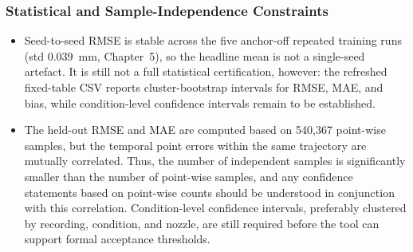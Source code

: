 \subsubsection*{Statistical and Sample-Independence Constraints}
\begin{itemize}
	\item Seed-to-seed RMSE is stable across the five anchor-off repeated training runs (std \SI{0.039}{mm}, Chapter~5), so the headline mean is not a single-seed artefact.
	      It is still not a full statistical certification, however: the refreshed fixed-table CSV reports cluster-bootstrap intervals for RMSE, MAE, and bias, while condition-level confidence intervals remain to be established.

	\item The held-out RMSE and MAE are computed based on 540,367 point-wise samples, but the temporal point errors within the same trajectory are mutually correlated.
	      Thus, the number of independent samples is significantly smaller than the number of point-wise samples, and any confidence statements based on point-wise counts should be understood in conjunction with this correlation.
	      Condition-level confidence intervals, preferably clustered by recording, condition, and nozzle, are still required before the tool can support formal acceptance thresholds.
\end{itemize}

